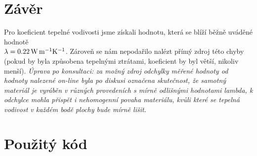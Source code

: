 \documentclass[czech,11pt,a4paper]{article}
\begin{document}
	
	\section{Závěr}
	Pro koeficient tepelné vodivosti jsme získali hodnotu, která se blíží běžně uváděné hodnotě \\
	${\lambda} = 0.22 \,\rm W \, m^{-1} K^{-1}$. Zároveň se nám nepodařilo nalézt přímý zdroj této chyby (pokud by byla způsobena tepelnými ztrátami, koeficient by byl větší, nikoliv menší). \textit{Úprava po konsultaci: za možný zdroj odchylky měřené hodnoty od hodnoty nalezené on-line byla po diskusi označena skutečnost, že samotný materiál je vyráběn v různých provedeních s mírně odlišnými hodnotami lambda, k odchylce mohla přispět i nehomogenní povaha materiálu, kvůli které se tepelná vodivost v každém bodě plochy bude mírně lišit.}
	\section{Použitý kód}
\end{document}
